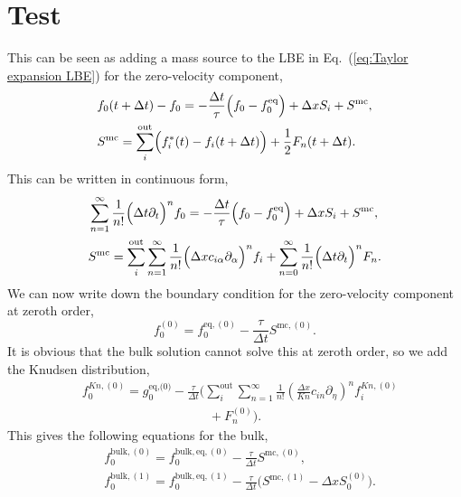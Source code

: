 \documentclass[aps,physrev,twocolumn,10pt]{revtex4-2}
\begin{document}
\section{Test}
This can be seen as adding a mass source to the LBE in Eq.~(\ref{eq:Taylor expansion LBE}) for the zero-velocity component,
\begin{equation}
\begin{split}
    &f_0(t + \Delta t) - f_0 = - \frac{\Delta t}{\tau}\Bigl(f_0 - f_0^\text{eq}\Bigr) + \Delta x S_i+ S^\text{mc},\\
    &S^\text{mc} = \sum_i^\text{out}\Bigl(f_i^*(t) - f_i(t+\Delta t)\Bigr) + \frac{1}{2}F_n(t+\Delta t).
\end{split}
\end{equation}
This can be written in continuous form,
\begin{equation}
\begin{split}
    &\sum_{n=1}^\infty \frac{1}{n!}\Bigl(\Delta t \partial_t\Bigr)^n f_0 = - \frac{\Delta t}{\tau}\Bigl(f_0 - f_0^\text{eq}\Bigr) + \Delta x S_i +  S^\text{mc},\\
    &S^\text{mc} = \sum_i^\text{out}\sum_{n=1}^\infty \frac{1}{n!}\Bigl(\Delta x c_{i\alpha} \partial_\alpha\Bigr)^n f_i + \sum_{n=0}^\infty \frac{1}{n!} \Bigl(\Delta t \partial_t\Bigr)^n F_n.
\end{split}
\end{equation}
We can now write down the boundary condition for the zero-velocity component at zeroth order,
\begin{equation}
    f_0^{(0)} = f_0^{\text{eq},(0)} - \frac{\tau}{\Delta t}S^{\text{mc},(0)}.
\end{equation}
It is obvious that the bulk solution cannot solve this at zeroth order, so we add the Knudsen distribution,
\begin{equation}
\begin{split}
    &f_0^{\textit{Kn},(0)} = g_0^\text{eq,(0)} - \frac{\tau}{\Delta t}\Biggl(\sum_i^\text{out}\sum_{n=1}^\infty \frac{1}{n!}\left(\frac{\Delta x}{\textit{Kn}} c_{i n} \partial_\eta\right)^n f_i^{\textit{Kn},(0)}\\
    &\qquad\qquad\qquad\qquad\qquad + F_n^{(0)}\Biggr).
\end{split}
\end{equation}
This gives the following equations for the bulk,
\begin{equation}
\begin{split}
    &f_0^{\text{bulk},(0)} = f_0^{\text{bulk},\text{eq},(0)} - \frac{\tau}{\Delta t}S^{\text{mc},(0)},\\
    &f_0^{\text{bulk},(1)} = f_0^{\text{bulk},\text{eq},(1)} - \frac{\tau}{\Delta t}\Biggl(S^{\text{mc},(1)}-\Delta xS_0^{(0)}\Biggr).
\end{split}
\end{equation}
\end{document}
